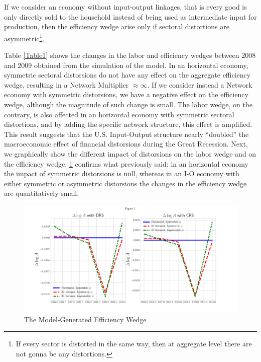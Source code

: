 \documentclass[english,letter,11pt,twoside]{article}
\begin{document}
If we consider an economy without input-output linkages, that is every good is only directly sold to the household instead of being used as intermediate input for production, then the efficiency wedge arise only if sectoral distortions are asymmetric\footnote{If every sector is distorted in the same way, then at aggregate level there are not gonna be any distortions.}.

Table \ref{Table1} shows the changes in the labor and efficiency wedges between 2008 and 2009 obtained from the simulation of the model. In an horizontal economy, symmetric sectoral distorsions do not have any effect on the aggregate efficiency wedge, resulting in a Network Multiplier $\approx \infty$. If we consider instead a Network economy with symmetric distorsions, we have a negative effect on the efficiency wedge, although the magnitude of such change is small. The labor wedge, on the contrary, is also affected in an horizontal economy with symmetric sectoral distortions, and by adding the specific network structure, this effect is amplified. This result suggests that the U.S. Input-Output structure nearly ``doubled'' the macroeconomic effect of financial distorsions during the Great Recession. Next, we graphically show the different impact of distorsions on the labor wedge and on the efficiency wedge. \ref{efficiency_graph} confirms what previously said: in an horizontal economy the impact of symmetric distorsions is null, whereas in an I-O economy with either symmetric or asymmetric distorsions the changes in the efficiency wedge are quantitatively small. 

\begin{figure}[!h]
\centering
\includegraphics[scale=0.5]{figure1.png}
\caption{The Model-Generated Efficiency Wedge}
\label{efficiency_graph}
\end{figure}
\end{document}
